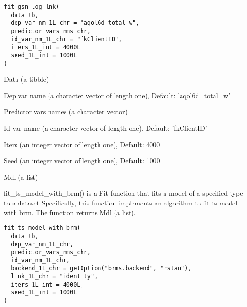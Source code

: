 \documentclass[a4paper]{book}
\begin{document}
%
\begin{Usage}
\begin{verbatim}
fit_gsn_log_lnk(
  data_tb,
  dep_var_nm_1L_chr = "aqol6d_total_w",
  predictor_vars_nms_chr,
  id_var_nm_1L_chr = "fkClientID",
  iters_1L_int = 4000L,
  seed_1L_int = 1000L
)
\end{verbatim}
\end{Usage}
%
\begin{Arguments}
\begin{ldescription}
\item[\code{data\_tb}] Data (a tibble)

\item[\code{dep\_var\_nm\_1L\_chr}] Dep var name (a character vector of length one), Default: 'aqol6d\_total\_w'

\item[\code{predictor\_vars\_nms\_chr}] Predictor vars names (a character vector)

\item[\code{id\_var\_nm\_1L\_chr}] Id var name (a character vector of length one), Default: 'fkClientID'

\item[\code{iters\_1L\_int}] Iters (an integer vector of length one), Default: 4000

\item[\code{seed\_1L\_int}] Seed (an integer vector of length one), Default: 1000
\end{ldescription}
\end{Arguments}
%
\begin{Value}
Mdl (a list)
\end{Value}
%
\begin{Description}\relax
fit\_ts\_model\_with\_brm() is a Fit function that fits a model of a specified type to a dataset Specifically, this function implements an algorithm to fit ts model with brm. The function returns Mdl (a list).
\end{Description}
%
\begin{Usage}
\begin{verbatim}
fit_ts_model_with_brm(
  data_tb,
  dep_var_nm_1L_chr,
  predictor_vars_nms_chr,
  id_var_nm_1L_chr,
  backend_1L_chr = getOption("brms.backend", "rstan"),
  link_1L_chr = "identity",
  iters_1L_int = 4000L,
  seed_1L_int = 1000L
)
\end{verbatim}
\end{Usage}
\end{document}
